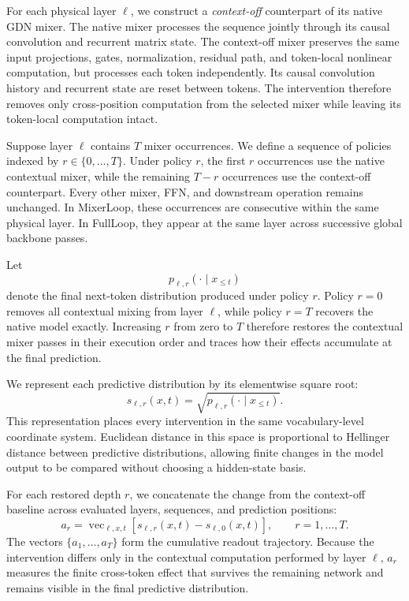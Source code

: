 \documentclass[letterpaper]{article} %
\begin{document}
For each physical layer $\ell$, we construct a \emph{context-off} counterpart
of its native GDN mixer. The native mixer processes the sequence jointly through
its causal convolution and recurrent matrix state. The context-off mixer
preserves the same input projections, gates, normalization, residual path, and
token-local nonlinear computation, but processes each token independently. Its
causal convolution history and recurrent state are reset between tokens. The
intervention therefore removes only cross-position computation from the
selected mixer while leaving its token-local computation intact.

Suppose layer $\ell$ contains $T$ mixer occurrences. We define a sequence of
policies indexed by $r\in\{0,\ldots,T\}$. Under policy $r$, the first $r$
occurrences use the native contextual mixer, while the remaining $T-r$
occurrences use the context-off counterpart. Every other mixer, FFN, and
downstream operation remains unchanged. In MixerLoop, these occurrences are
consecutive within the same physical layer. In FullLoop, they appear at the
same layer across successive global backbone passes.

Let
\begin{equation}
p_{\ell,r}(\cdot\mid x_{\leq t})
\label{eq:intervention_distribution}
\end{equation}
denote the final next-token distribution produced under policy $r$. Policy
$r=0$ removes all contextual mixing from layer $\ell$, while policy $r=T$
recovers the native model exactly. Increasing $r$ from zero to $T$ therefore
restores the contextual mixer passes in their execution order and traces how
their effects accumulate at the final prediction.

We represent each predictive distribution by its elementwise square root:
\begin{equation}
s_{\ell,r}(x,t)
=\sqrt{
p_{\ell,r}(\cdot\mid x_{\leq t})
}.
\label{eq:sqrt_probability}
\end{equation}
This representation places every intervention in the same vocabulary-level
coordinate system. Euclidean distance in this space is proportional to
Hellinger distance between predictive distributions, allowing finite changes
in the model output to be compared without choosing a hidden-state basis.

For each restored depth $r$, we concatenate the change from the context-off
baseline across evaluated layers, sequences, and prediction positions:
\begin{equation}
a_r
=\operatorname{vec}_{\ell,x,t}\!\left[
s_{\ell,r}(x,t)-s_{\ell,0}(x,t)
\right],
\qquad
r=1,\ldots,T.
\label{eq:readout_trajectory}
\end{equation}
The vectors $\{a_1,\ldots,a_T\}$ form the cumulative readout trajectory.
Because the intervention differs only in the contextual computation performed
by layer $\ell$, $a_r$ measures the finite cross-token effect that survives the
remaining network and remains visible in the final predictive distribution.
\end{document}
